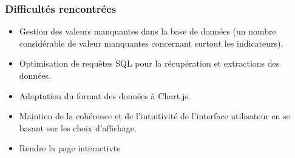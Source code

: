 \documentclass[11pt]{article}
\begin{document}
\subsubsection*{Difficultés rencontrées}
\begin{itemize}
    \item Gestion des valeurs manquantes dans la base de données (un nombre considérable de valeur manquantes concernant surtout les indicateurs).
    \item Optimisation de requêtes SQL pour la récupération et extractions des données.
    \item Adaptation du format des données à Chart.js.
    \item Maintien de la cohérence et de l’intuitivité de l’interface utilisateur en se basant sur les choix d'affichage.
    \item  Rendre la page interactivte
\end{itemize}
\end{document}

